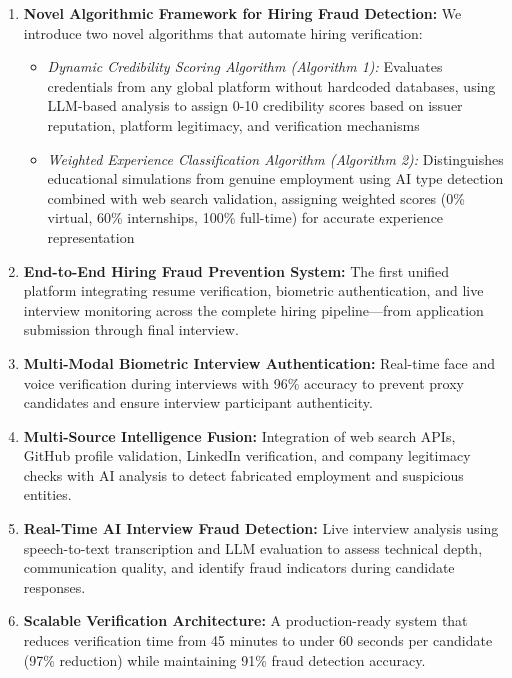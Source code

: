 \documentclass[journal]{IEEEtran}
\begin{document}
\begin{enumerate}
\item \textbf{Novel Algorithmic Framework for Hiring Fraud Detection:} We introduce two novel algorithms that automate hiring verification:
\begin{itemize}
\item \emph{Dynamic Credibility Scoring Algorithm (Algorithm 1):} Evaluates credentials from any global platform without hardcoded databases, using LLM-based analysis to assign 0-10 credibility scores based on issuer reputation, platform legitimacy, and verification mechanisms
\item \emph{Weighted Experience Classification Algorithm (Algorithm 2):} Distinguishes educational simulations from genuine employment using AI type detection combined with web search validation, assigning weighted scores (0\% virtual, 60\% internships, 100\% full-time) for accurate experience representation
\end{itemize}

\item \textbf{End-to-End Hiring Fraud Prevention System:} The first unified platform integrating resume verification, biometric authentication, and live interview monitoring across the complete hiring pipeline—from application submission through final interview.

\item \textbf{Multi-Modal Biometric Interview Authentication:} Real-time face and voice verification during interviews with 96\% accuracy to prevent proxy candidates and ensure interview participant authenticity.

\item \textbf{Multi-Source Intelligence Fusion:} Integration of web search APIs, GitHub profile validation, LinkedIn verification, and company legitimacy checks with AI analysis to detect fabricated employment and suspicious entities.

\item \textbf{Real-Time AI Interview Fraud Detection:} Live interview analysis using speech-to-text transcription and LLM evaluation to assess technical depth, communication quality, and identify fraud indicators during candidate responses.

\item \textbf{Scalable Verification Architecture:} A production-ready system that reduces verification time from 45 minutes to under 60 seconds per candidate (97\% reduction) while maintaining 91\% fraud detection accuracy.
\end{enumerate}
\end{document}
